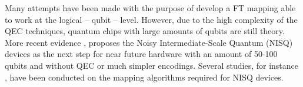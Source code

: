\documentclass[11pt]{article}
\begin{document}
Many attempts have been made \cite{Dousti_2014,Heckey_2015,hwang18:hierar_system_mappin_large_scale,murphy18:contr,Lao_2018} with the purpose of develop a FT mapping able to work at the logical -- qubit -- level.
However, due to the high complexity of the QEC techniques, quantum chips with large amounts of qubits are still theory.
More recent evidence \cite{Preskill_2018}, proposes the Noisy Intermediate-Scale Quantum (NISQ) devices as the next step for near future hardware with an amount of 50-100 qubits and without QEC or much simpler encodings.
Several studies, for instance \cite{tannu18:case_variab_aware_polic_nisq,paler18:nisq,paler18:influen_initial_qubit_placem_durin}, have been conducted on the mapping algorithms required for NISQ devices.




\end{document}
